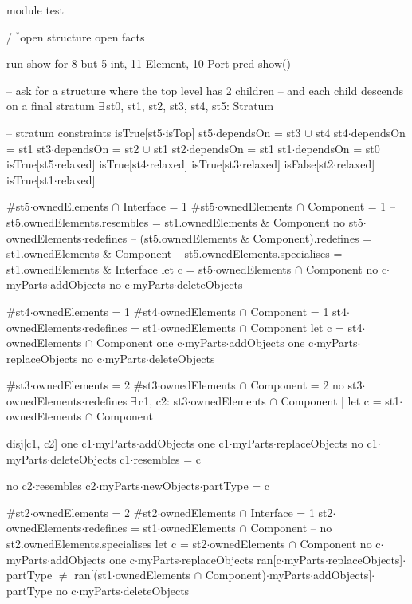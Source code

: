 module test

/ $\!\!\!^\ast\!$open structure
open facts


run show for 8 but 5 int, 11 Element, 10 Port
pred show()
{
  -- ask for a structure where the top level has 2 children
  -- and each child descends on a final stratum
  $\exists\,$st0, st1, st2, st3, st4, st5: Stratum
  {
    -- stratum constraints
    isTrue[st5$\cdot$isTop]
    st5$\cdot$dependsOn = st3 $\cup$ st4
    st4$\cdot$dependsOn = st1
    st3$\cdot$dependsOn = st2 $\cup$ st1
    st2$\cdot$dependsOn = st1
    st1$\cdot$dependsOn = st0
    isTrue[st5$\cdot$relaxed]
    isTrue[st4$\cdot$relaxed]
    isTrue[st3$\cdot$relaxed]
    isFalse[st2$\cdot$relaxed]
    isTrue[st1$\cdot$relaxed]
    
    #st5$\cdot$ownedElements $\cap$ Interface = 1
    #st5$\cdot$ownedElements $\cap$ Component = 1
--    st5.ownedElements.resembles = st1.ownedElements & Component
    no st5$\cdot$ownedElements$\cdot$redefines
--    (st5.ownedElements & Component).redefines = st1.ownedElements & Component
--    st5.ownedElements.specialises = st1.ownedElements & Interface
    let c = st5$\cdot$ownedElements $\cap$ Component
    {
      no c$\cdot$myParts$\cdot$addObjects
      no c$\cdot$myParts$\cdot$deleteObjects
    }
    
    #st4$\cdot$ownedElements = 1
    #st4$\cdot$ownedElements $\cap$ Component = 1
    st4$\cdot$ownedElements$\cdot$redefines = st1$\cdot$ownedElements $\cap$ Component
    let c = st4$\cdot$ownedElements $\cap$ Component
    {
      one c$\cdot$myParts$\cdot$addObjects
      one c$\cdot$myParts$\cdot$replaceObjects
      no c$\cdot$myParts$\cdot$deleteObjects
    }

    #st3$\cdot$ownedElements = 2
    #st3$\cdot$ownedElements $\cap$ Component = 2
    no st3$\cdot$ownedElements$\cdot$redefines
    $\exists\,$c1, c2: st3$\cdot$ownedElements $\cap$ Component |
      let c = st1$\cdot$ownedElements $\cap$ Component
    {
      disj[c1, c2]
      one c1$\cdot$myParts$\cdot$addObjects
      one c1$\cdot$myParts$\cdot$replaceObjects
      no c1$\cdot$myParts$\cdot$deleteObjects
      c1$\cdot$resembles = c
      
      no c2$\cdot$resembles
      c2$\cdot$myParts$\cdot$newObjects$\cdot$partType = c
    }

    #st2$\cdot$ownedElements = 2
    #st2$\cdot$ownedElements $\cap$ Interface = 1
    st2$\cdot$ownedElements$\cdot$redefines = st1$\cdot$ownedElements $\cap$ Component  
--    no st2.ownedElements.specialises
    let c = st2$\cdot$ownedElements $\cap$ Component
    {
      no c$\cdot$myParts$\cdot$addObjects
      one c$\cdot$myParts$\cdot$replaceObjects
      ran[c$\cdot$myParts$\cdot$replaceObjects]$\cdot$partType $\neq$
        ran[(st1$\cdot$ownedElements $\cap$ Component)$\cdot$myParts$\cdot$addObjects]$\cdot$partType
      no c$\cdot$myParts$\cdot$deleteObjects      
    }
    
}}
